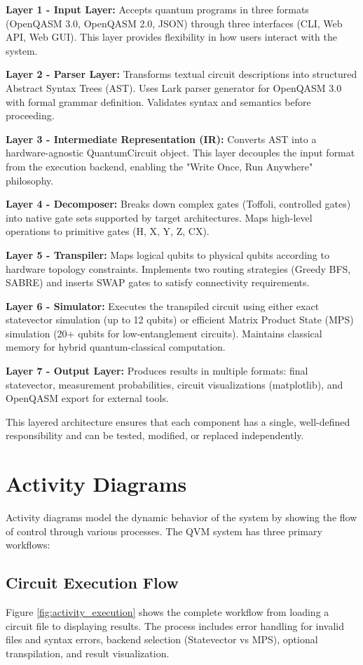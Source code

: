 \textbf{Layer 1 - Input Layer:} Accepts quantum programs in three formats (OpenQASM 3.0, OpenQASM 2.0, JSON) through three interfaces (CLI, Web API, Web GUI). This layer provides flexibility in how users interact with the system.

\textbf{Layer 2 - Parser Layer:} Transforms textual circuit descriptions into structured Abstract Syntax Trees (AST). Uses Lark parser generator for OpenQASM 3.0 with formal grammar definition. Validates syntax and semantics before proceeding.

\textbf{Layer 3 - Intermediate Representation (IR):} Converts AST into a hardware-agnostic QuantumCircuit object. This layer decouples the input format from the execution backend, enabling the "Write Once, Run Anywhere" philosophy.

\textbf{Layer 4 - Decomposer:} Breaks down complex gates (Toffoli, controlled gates) into native gate sets supported by target architectures. Maps high-level operations to primitive gates (H, X, Y, Z, CX).

\textbf{Layer 5 - Transpiler:} Maps logical qubits to physical qubits according to hardware topology constraints. Implements two routing strategies (Greedy BFS, SABRE) and inserts SWAP gates to satisfy connectivity requirements.

\textbf{Layer 6 - Simulator:} Executes the transpiled circuit using either exact statevector simulation (up to 12 qubits) or efficient Matrix Product State (MPS) simulation (20+ qubits for low-entanglement circuits). Maintains classical memory for hybrid quantum-classical computation.

\textbf{Layer 7 - Output Layer:} Produces results in multiple formats: final statevector, measurement probabilities, circuit visualizations (matplotlib), and OpenQASM export for external tools.

This layered architecture ensures that each component has a single, well-defined responsibility and can be tested, modified, or replaced independently.

\section{Activity Diagrams}
Activity diagrams model the dynamic behavior of the system by showing the flow of control through various processes. The QVM system has three primary workflows:

\subsection{Circuit Execution Flow}
Figure \ref{fig:activity_execution} shows the complete workflow from loading a circuit file to displaying results. The process includes error handling for invalid files and syntax errors, backend selection (Statevector vs MPS), optional transpilation, and result visualization.

